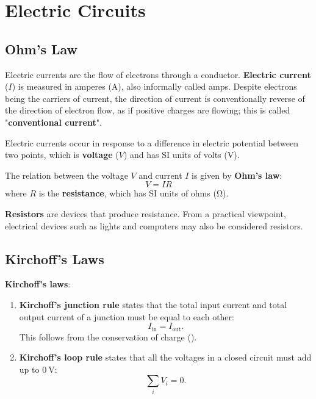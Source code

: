 \chapter{Electric Circuits}

\section{Ohm's Law}

Electric currents are the flow of electrons through a conductor.
\textbf{Electric current} (\(I\)) is measured in amperes (\unit{\ampere}),
also informally called amps.
Despite electrons being the carriers of current,
the direction of current is conventionally reverse of the direction
of electron flow,
as if positive charges are flowing;
this is called "\textbf{conventional current}".

Electric currents occur in response
to a difference in electric potential between two points,
which is \textbf{voltage} (\(V\))
and has SI units of volts (\unit{\volt}).

The relation between the voltage \(V\) and current \(I\) is given by
\textbf{Ohm's law}:
\begin{equation} \label{eq:ohms-law}
  V = I R
\end{equation}
where \(R\) is the \textbf{resistance}, which has SI units of ohms
(\unit{\ohm}).

\textbf{Resistors} are devices that produce resistance.
From a practical viewpoint,
electrical devices such as lights and computers may also be
considered resistors.

\section{Kirchoff's Laws}

\textbf{Kirchoff's laws}:
\begin{enumerate}
  \item
    \textbf{Kirchoff's junction rule}
    states that the total input current and total output current
    of a junction
    must be equal to each other:
    \begin{equation}
      I_\mathrm{in} = I_\mathrm{out}.
    \end{equation}
    This follows from the conservation of charge
    ().
  \item
    \textbf{Kirchoff's loop rule} states that all the voltages in
    a closed circuit
    must add up to \(\qty{0}{\volt}\):
    \begin{equation}
      \sum_i V_i = 0.
    \end{equation}
\end{enumerate}

